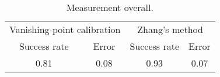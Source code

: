 \begin{table}[H]
\centering
\begin{tabular}{@{} *4c @{}}
\toprule
\multicolumn{2}{c}{Vanishing point calibration} & \multicolumn{2}{c}{Zhang's method}\\ 
\cmidrule(r){1-2}
\cmidrule(r){3-4}
Success rate & Error & Success rate & Error \\
\midrule
 0.81 & 0.08 & 0.93 & 0.07 \\ 
\bottomrule 
 \end{tabular}
 \caption{Measurement overall.}
\label{table:key_measurement_overall}
\end{table}

